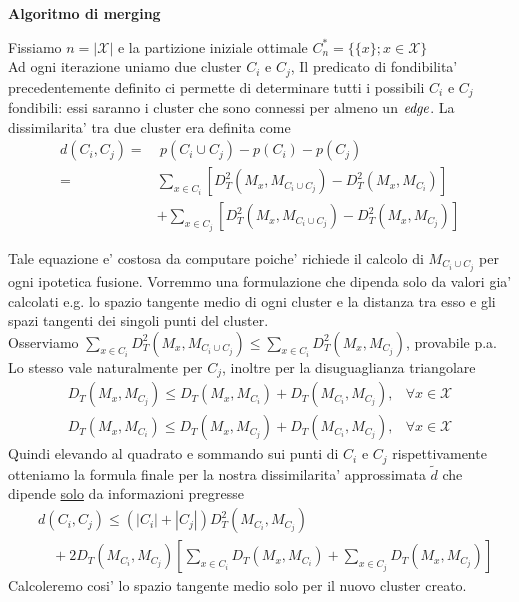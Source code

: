 \documentclass[a4, landscape]{seminar}
\theoremstyle{definition}
\def\bc{\begin{center}}
\def\ec{\end{center}}
\def\bs{\begin{slide}\begingroup\small}
\def\es{\endgroup\end{slide}}
\begin{document}
\bs
\bc{\bf\color{blue}Algoritmo di merging}\ec
Fissiamo $n=|\mathcal{X}|$ e la partizione iniziale ottimale $C^{*}_n = \{\{x\}; x\in\mathcal{X}\}$ \\
Ad ogni iterazione uniamo due cluster $C_i$ e $C_j$, Il predicato di fondibilita' precedentemente definito ci permette
di determinare tutti i possibili $C_i$ e $C_j$ fondibili: essi saranno i cluster che sono connessi per almeno un $\it{edge}$.
La dissimilarita' tra due cluster era definita come \\
\begin{equation*}
\begin{aligned}
d(C_i, C_j) =& \ p(C_i\cup C_j) - p(C_i) - p(C_j) \\
=& \sum_{x \in C_{i}} \left[D_{T}^{2}\left(M_{x}, M_{C_{i} \cup C_{j}}\right)- D_{T}^{2}\left(M_{x}, M_{C_{i}}\right)\right] \\
&+\sum_{x \in C_{j}} \left[D_{T}^{2}\left(M_{x}, M_{C_{i} \cup C_{j}}\right)-D_{T}^{2}\left(M_{x}, M_{C_{j}}\right)\right]
\end{aligned}
\end{equation*}
\es

\bs
Tale equazione e' costosa da computare poiche' richiede il calcolo di $M_{C_i\cup C_j}$ per ogni ipotetica fusione.
Vorremmo una formulazione che dipenda solo da valori gia' calcolati e.g. lo spazio tangente medio di ogni cluster e
la distanza tra esso e gli spazi tangenti dei singoli punti del cluster. \\
Osserviamo $\sum_{x \in C_{i}} D_{T}^{2}\left(M_{x}, M_{C_{i} \cup C_{j}}\right) \leq \sum_{x \in C_{i}} D_{T}^{2}\left(M_{x}, M_{C_{j}}\right)$, provabile p.a.
Lo stesso vale naturalmente per $C_j$, inoltre per la disuguaglianza triangolare
\begin{equation*}
  \begin{array}{ll}
    D_{T}\left(M_{x}, M_{C_{j}}\right) \leq D_{T}\left(M_{x}, M_{C_{i}}\right)+D_{T}\left(M_{C_{i}}, M_{C_{j}}\right), & \forall x \in \mathcal{X} \\
    D_{T}\left(M_{x}, M_{C_{i}}\right) \leq D_{T}\left(M_{x}, M_{C_{j}}\right)+D_{T}\left(M_{C_{i}}, M_{C_{j}}\right), & \forall x \in \mathcal{X}
    \end{array}
\end{equation*}
Quindi elevando al quadrato e sommando sui punti di $C_i$ e $C_j$ rispettivamente otteniamo la formula finale per la nostra dissimilarita' approssimata $\tilde{d}$
che dipende \underline{solo} da informazioni pregresse
\begin{equation*}
  \begin{aligned}
    &d\left(C_{i}, C_{j}\right) \leq\left(\left|C_{i}\right|+\left|C_{j}\right|\right) D_{T}^{2}\left(M_{C_{i}}, M_{C_{j}}\right) \\
    &\quad+2 D_{T}\left(M_{C_{i}}, M_{C_{j}}\right)\left[\sum_{x \in C_{i}} D_{T}\left(M_{x}, M_{C_{i}}\right)+\sum_{x \in C_{j}} D_{T}\left(M_{x}, M_{C_{j}}\right)\right]
  \end{aligned}
\end{equation*}
Calcoleremo cosi' lo spazio tangente medio solo per il nuovo cluster creato.
\es
\end{document}
